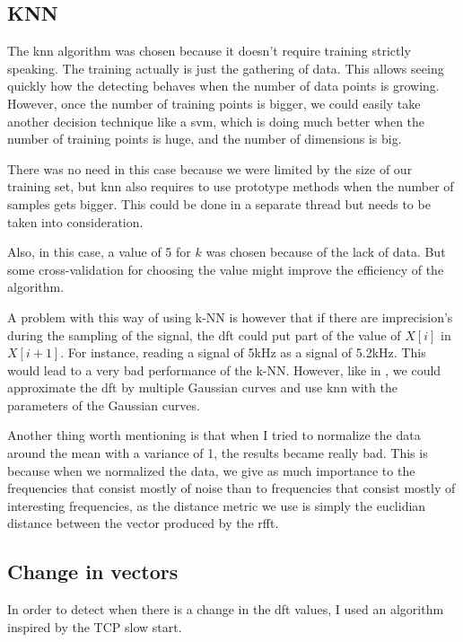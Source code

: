 \subsection{KNN}\label{section:knn}
The \acrshort{knn} algorithm was chosen because it doesn't require training strictly speaking. The training actually is just the gathering of data. This allows seeing quickly how the detecting behaves when the number of data points is growing. However, once the number of training points is bigger, we could easily take another decision technique like a \acrshort{svm}, which is doing much better when the number of training points is huge, and the number of dimensions is big.

There was no need in this case because we were limited by the size of our training set, but \acrshort{knn} also requires to use prototype methods when the number of samples gets bigger. This could be done in a separate thread but needs to be taken into consideration.

Also, in this case, a value of 5 for $k$ was chosen because of the lack of data. But some cross-validation for choosing the value might improve the efficiency of the algorithm.

A problem with this way of using k-NN is however that if there are imprecision's during the sampling of the signal, the \acrshort{dft} could put part of the value of $X[i]$ in $X[i+1]$. For instance, reading a signal of 5kHz as a signal of 5.2kHz. This would lead to a very bad performance of the k-NN.
However, like in \cite{gupta2010electrisense}, we could approximate the \acrshort{dft} by multiple Gaussian curves and use \acrshort{knn} with the parameters of the Gaussian curves.

Another thing worth mentioning is that when I tried to normalize the data around the mean with a variance of 1, the results became really bad. This is because when we normalized the data, we give as much importance to the frequencies that consist mostly of noise than to frequencies that consist mostly of interesting frequencies, as the distance metric we use is simply the euclidian distance between the vector produced by the \acrshort{rfft}.


\subsection{Change in vectors}
In order to detect when there is a change in the \acrshort{dft} values, I used an algorithm inspired by the TCP slow start.

